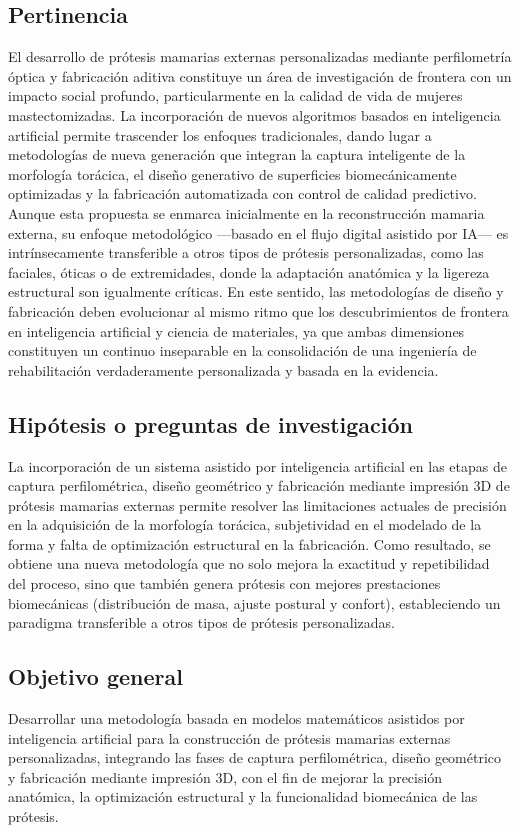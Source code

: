 \documentclass[12pt,a4paper]{article}
\begin{document}
\subsection{Pertinencia}
El desarrollo de prótesis mamarias externas personalizadas mediante perfilometría óptica y fabricación aditiva constituye un área de investigación de frontera con un impacto social profundo, particularmente en la calidad de vida de mujeres mastectomizadas. La incorporación de nuevos algoritmos basados en inteligencia artificial permite trascender los enfoques tradicionales, dando lugar a metodologías de nueva generación que integran la captura inteligente de la morfología torácica, el diseño generativo de superficies biomecánicamente optimizadas y la fabricación automatizada con control de calidad predictivo. Aunque esta propuesta se enmarca inicialmente en la reconstrucción mamaria externa, su enfoque metodológico —basado en el flujo digital asistido por IA— es intrínsecamente transferible a otros tipos de prótesis personalizadas, como las faciales, óticas o de extremidades, donde la adaptación anatómica y la ligereza estructural son igualmente críticas. En este sentido, las metodologías de diseño y fabricación deben evolucionar al mismo ritmo que los descubrimientos de frontera en inteligencia artificial y ciencia de materiales, ya que ambas dimensiones constituyen un continuo inseparable en la consolidación de una ingeniería de rehabilitación verdaderamente personalizada y basada en la evidencia.


\subsection{Hipótesis o preguntas de investigación}
La incorporación de un sistema asistido por inteligencia artificial en las etapas de captura perfilométrica, diseño geométrico y fabricación mediante impresión 3D de prótesis mamarias externas permite resolver las limitaciones actuales de precisión en la adquisición de la morfología torácica, subjetividad en el modelado de la forma y falta de optimización estructural en la fabricación. Como resultado, se obtiene una nueva metodología que no solo mejora la exactitud y repetibilidad del proceso, sino que también genera prótesis con mejores prestaciones biomecánicas (distribución de masa, ajuste postural y confort), estableciendo un paradigma transferible a otros tipos de prótesis personalizadas.

\subsection{Objetivo general}
Desarrollar una metodología basada en modelos matemáticos asistidos por inteligencia artificial para la construcción de prótesis mamarias externas personalizadas, integrando las fases de captura perfilométrica, diseño geométrico y fabricación mediante impresión 3D, con el fin de mejorar la precisión anatómica, la optimización estructural y la funcionalidad biomecánica de las prótesis.
\end{document}
